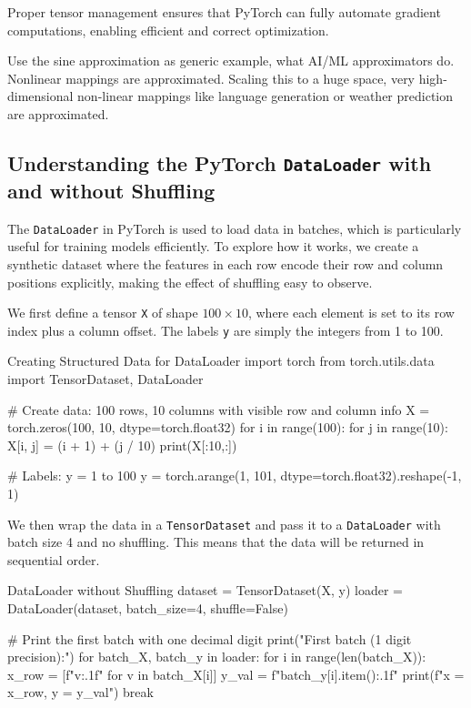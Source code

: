 Proper tensor management ensures that PyTorch can fully automate gradient computations, enabling efficient and correct optimization.

\begin{recommendationbox}
Use the sine approximation as generic example, what AI/ML approximators do. Nonlinear mappings are approximated. Scaling this to a huge space, very high-dimensional non-linear mappings like language generation or weather prediction are approximated. 
\end{recommendationbox}


%
\subsection{Understanding the PyTorch \texttt{DataLoader} with and without Shuffling}

The \texttt{DataLoader} in PyTorch is used to load data in batches, which is particularly useful for training models efficiently. To explore how it works, we create a synthetic dataset where the features in each row encode their row and column positions explicitly, making the effect of shuffling easy to observe.

We first define a tensor \texttt{X} of shape $100 \times 10$, where each element is set to its row index plus a column offset. The labels \texttt{y} are simply the integers from 1 to 100.

\begin{codeonly}{Creating Structured Data for DataLoader}
import torch
from torch.utils.data import TensorDataset, DataLoader

# Create data: 100 rows, 10 columns with visible row and column info
X = torch.zeros(100, 10, dtype=torch.float32)
for i in range(100):
    for j in range(10):
        X[i, j] = (i + 1) + (j / 10)
print(X[:10,:])

# Labels: y = 1 to 100
y = torch.arange(1, 101, dtype=torch.float32).reshape(-1, 1)
\end{codeonly}

We then wrap the data in a \texttt{TensorDataset} and pass it to a \texttt{DataLoader} with batch size 4 and no shuffling. This means that the data will be returned in sequential order.

\begin{codeonly}{DataLoader without Shuffling}
dataset = TensorDataset(X, y)
loader = DataLoader(dataset, batch_size=4, shuffle=False)

# Print the first batch with one decimal digit
print("First batch (1 digit precision):")
for batch_X, batch_y in loader:
    for i in range(len(batch_X)):
        x_row = [f"{v:.1f}" for v in batch_X[i]]
        y_val = f"{batch_y[i].item():.1f}"
        print(f"x = {x_row}, y = {y_val}")
    break
\end{codeonly}

